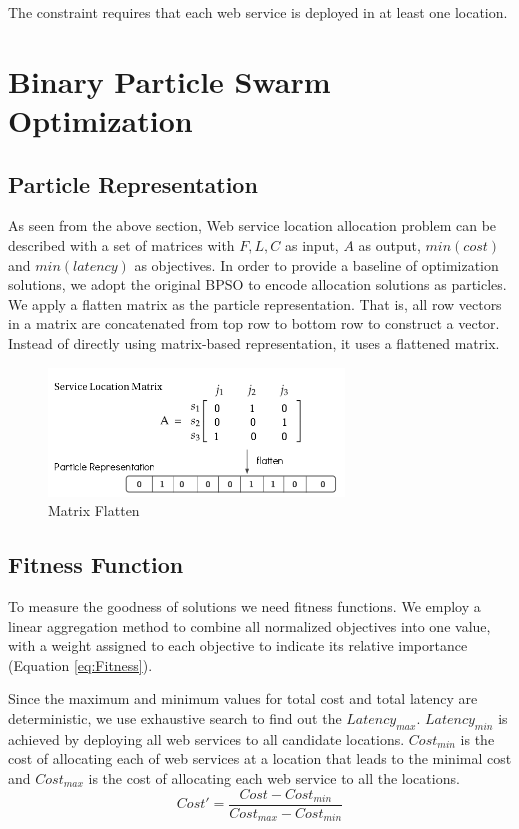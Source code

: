 \begin{flushleft}The constraint requires that each web service is deployed in at least one location.\end{flushleft}

\section{Binary Particle Swarm Optimization}
\subsection{Particle Representation}
\label{sec:rep}

As seen from the above section, Web service location allocation problem can be described with a set of matrices with $F, L, C$ as input, $A$ as output, $min(cost)$ and $min(latency)$ as objectives.
In order to provide a baseline of optimization solutions, we adopt the original BPSO to encode allocation solutions as particles. 
We apply a flatten matrix as the particle representation.
That is, all row vectors in a matrix are concatenated from top row to bottom row to construct a vector.
 Instead of directly using matrix-based representation, it uses a flattened matrix.
 
 \begin{figure}[H]
 \centering
   \includegraphics[width=0.7\textwidth]{pics/psorepresentation.png}
   \caption{Matrix Flatten}
   \label{fig:flatten}
 \end{figure}
 
 \subsection{Fitness Function}
To measure the goodness of solutions we need fitness functions.
We employ a linear aggregation method to combine all normalized objectives into one value, with a weight assigned to each
objective to indicate its relative importance (Equation \ref{eq:Fitness}).

Since the maximum and minimum values for total cost and total latency are deterministic, we use exhaustive search to
find out the $Latency_{max}$. $Latency_{min}$ is achieved by deploying all web services to all candidate locations.
$Cost_{min}$ is the cost of allocating each of web services at a location that leads to the minimal cost 
and $Cost_{max}$ is the cost of allocating each web service to all the locations.
 \begin{equation}
 	\label{eq:cost_prime}
 	Cost' = \frac{Cost - Cost_{min}}{Cost_{max} - Cost_{min}}
 \end{equation}
 
